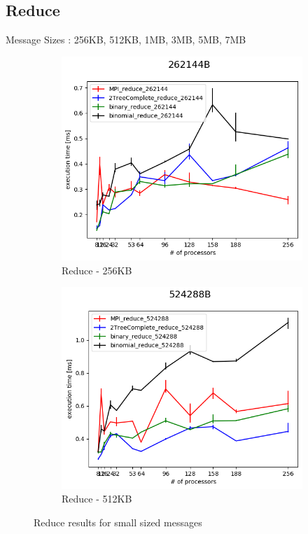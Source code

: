 \documentclass[sigplan,review,anonymous]{acmart}\settopmatter{printfolios=true,printccs=false,printacmref=false}
\begin{document}
\subsection{Reduce}

Message Sizes : 256KB, 512KB, 1MB, 3MB, 5MB, 7MB

\begin{figure}
\centering
\begin{subfigure}{.25\textwidth}
  \centering
  \includegraphics[width=1\linewidth]{images/Results/reduce_comp_262144B.png}
  \caption{Reduce - 256KB}
  \label{reduce-selected-256B}
\end{subfigure}%
\begin{subfigure}{.25\textwidth}
  \centering
  \includegraphics[width=1\linewidth]{images/Results/reduce_comp_524288B.png}
  \caption{Reduce - 512KB}
  \label{reduce-selected-512B}
\end{subfigure}
\caption{Reduce results for small sized messages}
\label{graph-reduce-small-selected}
\end{figure}
\end{document}
